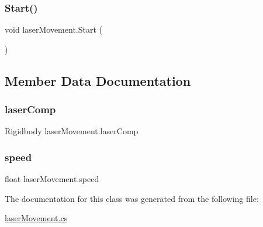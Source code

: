 \subsubsection{\texorpdfstring{Start()}{Start()}}
{\footnotesize\ttfamily void laser\+Movement.\+Start (\begin{DoxyParamCaption}{ }\end{DoxyParamCaption})\hspace{0.3cm}{\ttfamily [private]}}



\subsection{Member Data Documentation}
\mbox{\label{classlaser_movement_ae7c67c229eb3081c017be2f359db80e3}} 
\subsubsection{\texorpdfstring{laser\+Comp}{laserComp}}
{\footnotesize\ttfamily Rigidbody laser\+Movement.\+laser\+Comp\hspace{0.3cm}{\ttfamily [private]}}

\mbox{\label{classlaser_movement_a970c3ffad1f10386b83d4f54dcebc21d}} 
\subsubsection{\texorpdfstring{speed}{speed}}
{\footnotesize\ttfamily float laser\+Movement.\+speed}



The documentation for this class was generated from the following file\+:\begin{DoxyCompactItemize}
\item 
\mbox{\hyperlink{laser_movement_8cs}{laser\+Movement.\+cs}}\end{DoxyCompactItemize}
